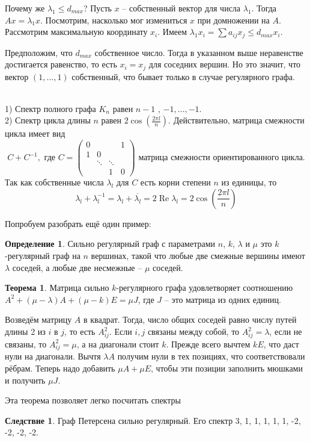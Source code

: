 \documentclass[10pt,a4paper,oneside]{book}
\theoremstyle{definition}
\newtheorem*{defn}{{\color{yellow!30!red} Определение}}
\newtheorem{thm}{{\color{red!40!black} Теорема}}
\newtheorem{cor}{Следствие}
\renewcommand{\Re}{\operatorname{Re}}
\newcommand{\ovl}{\overline}
\def\exm{\noindent {\bf Примеры:}}
\def\thrm{\begin{thm}}
\def\ethrm{\end{thm}}
\def\dfn{\begin{defn}}
\def\edfn{\end{defn}}
\def\crl{\begin{cor}}
\def\ecrl{\end{cor}}
\def\pmat{\begin{pmatrix}}
\def\epmat{\end{pmatrix}}
\begin{document}
Почему же $\lambda_1 \leq d_{max}$? Пусть $x$ -- собственный вектор для числа $\lambda_1$. Тогда $Ax=\lambda_1 x$. Посмотрим, насколько мог измениться $x$ при домножении на $A$. Рассмотрим максимальную координату $x_i$. Имеем $\lambda_1 x_i= \sum a_{ij}x_j\leq d_{max} x_i$.

Предположим, что $d_{max}$ собственное число. Тогда в указанном выше неравенстве достигается равенство, то есть $x_i=x_j$ для соседних вершин. Но это значит, что вектор $(1,\dots,1)$ собственный, что бывает только в случае регулярного графа. 
\endproof


\exm \\
1) Спектр полного графа $K_n$ равен $n-1$ , $-1, \dots,-1$.\\
2) Спектр цикла длины $n$ равен $2\cos(\frac{2\pi l}{n})$. Действительно, матрица смежности цикла имеет вид 
$$C + C^{-1}, \text{ где } C=\pmat 0 & && 1 \\  1 & 0 && \\ & \ddots & \ddots & \\ & &1&0 \epmat \text{ матрица смежности ориентированного цикла}. $$
Так как собственные числа $\lambda_l$ для $C$ есть корни степени $n$ из единицы, то 
$$\lambda_l+\lambda_l^{-1}= \lambda_l+\ovl{\lambda_l}= 2\Re \lambda_l =2\cos\left(\frac{2\pi l}{n}\right)$$

\noindent Попробуем разобрать ещё один пример:

\dfn Сильно регулярный граф с параметрами $n$, $k$, $\lambda$ и $\mu$ это $k$-регулярный граф на $n$ вершинах, такой что любые две смежные вершины имеют $\lambda$ соседей, а любые две несмежные -- $\mu$ соседей.
\edfn

\thrm Матрица сильно $k$-регулярного графа удовлетворяет соотношению $A^2+(\mu-\lambda)A + (\mu-k)E=\mu J$, где $J$ -- это матрица из одних единиц.
\ethrm
\proof Возведём матрицу $A$ в квадрат. Тогда, число общих соседей равно числу путей длины 2 из $i$ в $j$, то есть $A^2_{ij}$. Если $i,j$ связаны между собой, то $A^2_{ij}=\lambda$, если не связаны, то $A^2_{ij}=\mu$, а на диагонали стоит $k$. Прежде всего вычтем $kE$, что даст нули на диагонали. Вычтя $\lambda A$ получим нули в тех позициях, что соответствовали рёбрам. Теперь надо добавить $\mu A+ \mu E$, чтобы эти позиции заполнить мюшками и получить $\mu J$. 
\endproof

Эта теорема позволяет легко посчитать спектры 
\crl
 Граф Петерсена сильно регулярный. Его спектр 3, 1, 1, 1, 1, 1, -2, -2, -2, -2.
\ecrl
\end{document}
